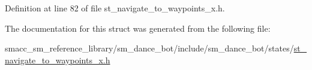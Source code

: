 Definition at line 82 of file st\+\_\+navigate\+\_\+to\+\_\+waypoints\+\_\+x.\+h.



The documentation for this struct was generated from the following file\+:\begin{DoxyCompactItemize}
\item 
smacc\+\_\+sm\+\_\+reference\+\_\+library/sm\+\_\+dance\+\_\+bot/include/sm\+\_\+dance\+\_\+bot/states/\hyperlink{st__navigate__to__waypoints__x_8h}{st\+\_\+navigate\+\_\+to\+\_\+waypoints\+\_\+x.\+h}\end{DoxyCompactItemize}
